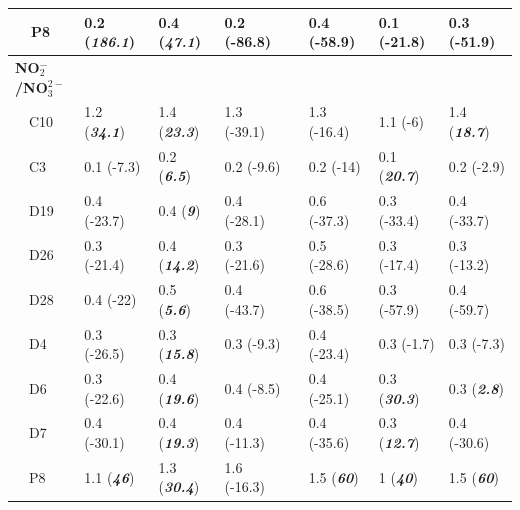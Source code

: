 \documentclass[letterpaper,12pt,oneside]{article}\usepackage[]{graphicx}\usepackage[]{color}
\begin{document}
\begin{table}[!tbp]
\begin{center}
\begin{tabular}{llllclll}
~~P8&0.2 \footnotesize{(\textit{\textbf{186.1}})}&0.4 \footnotesize{(\textit{\textbf{47.1}})}&0.2 \footnotesize{(-86.8)}&&0.4 \footnotesize{(-58.9)}&0.1 \footnotesize{(-21.8)}&0.3 \footnotesize{(-51.9)}\tabularnewline
\hline
{\bfseries NO$_{2}^{-}$/NO$_{3}^{2-}$}&&&&&&&\tabularnewline
~~C10&1.2 \footnotesize{(\textit{\textbf{34.1}})}&1.4 \footnotesize{(\textit{\textbf{23.3}})}&1.3 \footnotesize{(-39.1)}&&1.3 \footnotesize{(-16.4)}&1.1 \footnotesize{(-6)}&1.4 \footnotesize{(\textit{\textbf{18.7}})}\tabularnewline
~~C3&0.1 \footnotesize{(-7.3)}&0.2 \footnotesize{(\textit{\textbf{6.5}})}&0.2 \footnotesize{(-9.6)}&&0.2 \footnotesize{(-14)}&0.1 \footnotesize{(\textit{\textbf{20.7}})}&0.2 \footnotesize{(-2.9)}\tabularnewline
~~D19&0.4 \footnotesize{(-23.7)}&0.4 \footnotesize{(\textit{\textbf{9}})}&0.4 \footnotesize{(-28.1)}&&0.6 \footnotesize{(-37.3)}&0.3 \footnotesize{(-33.4)}&0.4 \footnotesize{(-33.7)}\tabularnewline
~~D26&0.3 \footnotesize{(-21.4)}&0.4 \footnotesize{(\textit{\textbf{14.2}})}&0.3 \footnotesize{(-21.6)}&&0.5 \footnotesize{(-28.6)}&0.3 \footnotesize{(-17.4)}&0.3 \footnotesize{(-13.2)}\tabularnewline
~~D28&0.4 \footnotesize{(-22)}&0.5 \footnotesize{(\textit{\textbf{5.6}})}&0.4 \footnotesize{(-43.7)}&&0.6 \footnotesize{(-38.5)}&0.3 \footnotesize{(-57.9)}&0.4 \footnotesize{(-59.7)}\tabularnewline
~~D4&0.3 \footnotesize{(-26.5)}&0.3 \footnotesize{(\textit{\textbf{15.8}})}&0.3 \footnotesize{(-9.3)}&&0.4 \footnotesize{(-23.4)}&0.3 \footnotesize{(-1.7)}&0.3 \footnotesize{(-7.3)}\tabularnewline
~~D6&0.3 \footnotesize{(-22.6)}&0.4 \footnotesize{(\textit{\textbf{19.6}})}&0.4 \footnotesize{(-8.5)}&&0.4 \footnotesize{(-25.1)}&0.3 \footnotesize{(\textit{\textbf{30.3}})}&0.3 \footnotesize{(\textit{\textbf{2.8}})}\tabularnewline
~~D7&0.4 \footnotesize{(-30.1)}&0.4 \footnotesize{(\textit{\textbf{19.3}})}&0.4 \footnotesize{(-11.3)}&&0.4 \footnotesize{(-35.6)}&0.3 \footnotesize{(\textit{\textbf{12.7}})}&0.4 \footnotesize{(-30.6)}\tabularnewline
~~P8&1.1 \footnotesize{(\textit{\textbf{46}})}&1.3 \footnotesize{(\textit{\textbf{30.4}})}&1.6 \footnotesize{(-16.3)}&&1.5 \footnotesize{(\textit{\textbf{60}})}&1 \footnotesize{(\textit{\textbf{40}})}&1.5 \footnotesize{(\textit{\textbf{60}})}\tabularnewline
\hline
\end{tabular}\end{center}

\end{table}
\end{document}
